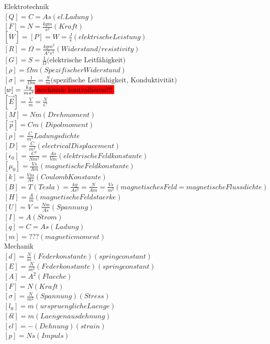 \documentclass[a4paper]{scrartcl}
\begin{document}
Elektrotechnik\\
$ [Q]=C=As (el. Ladung)$\\
$ [F]=N=\frac{kg m}{s^2} (Kraft)$\\
$ [\dot W]=[P]=W=\frac{J}{s} (elektrische Leistung)$\\
$ [R] = \Omega = \frac{kg m^2}{A^2 s^3} (Widerstand/resistivity) $\\
$ [G] = S = \frac{1}{\Omega} \text{(elektrische Leitfähigkeit)}$\\
$ [\rho] = \Omega m (Spezifischer Widerstand)$\\
$ [\sigma] = \frac{1}{\Omega m} = \frac{S}{m} \text{(spezifische Leitfähigkeit,
Konduktivität)} $\\
$ [w]=\frac{kg}{ms^2} \colorbox{red}{nochmals kontrollieren!!!} $\\
$ [\vec E]=\frac{V}{m} = \frac{N}{C}$\\
$ [M]=Nm (Drehmoment)$\\
$ [\vec p]=Cm (Dipolmoment)$\\
$ [\rho]=\frac{C}{m^3} Ladungsdichte$\\
$ [D]=\frac{C}{m^2} (electrical Displacement)$\\
$ [\epsilon_0]= \frac{C^2}{Nm^2}=\frac{As}{Vm} (elektrische Feldkonstante)$\\
$ [\mu_0] = \frac{Vs}{Am} (magnetische Feldkonstante)$\\
$ [k] = \frac{Vm}{As} (Coulomb Konstante)$\\
$ [B]= T (Tesla) = \frac{kg}{As^2} = \frac{N}{Am} = \frac{Vs}{m^2} (magnetisches
Feld = magnetische Flussdichte)$\\
$ [H]= \frac{A}{m} (magnetische Feldstaerke)$\\
$ [U]= V = \frac{Nm}{As} (Spannung) $\\
$ [I]= A (Strom) $\\
$ [q]= C = As (Ladung)$\\
$ [m]= ??? (magnetic moment)$\\

Mechanik\\
$ [d]=\frac{N}{m} (Federkonstante)(spring constant)$\\
$ [E]=\frac{N}{m^2} (Federkonstante)(spring constant)$\\
$ [A]=A^2 (Flaeche)$\\
$ [F]=N (Kraft)$\\
$ [\sigma]=\frac{N}{m^2} (Spannung)(Stress)$\\
$ [l_0]=m (urspruengliche Laenge)$\\
$ [\delta l]=m (Laengenausdehnung)$\\
$ [\epsilon l]=- (Dehnung)(strain)$\\
$ [p]=Ns (Impuls)$\\
\end{document}
